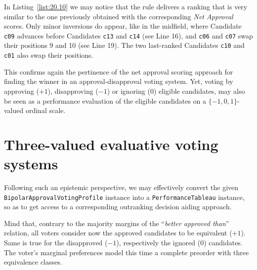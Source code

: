 In Listing~\vref{list:20.10} we may notice that the \NetFlows rule delivers a ranking that is very similar to the one previously obtained with the corresponding \emph{Net Approval} scores. Only minor inversions do appear, like in the midfield, where Candidate \texttt{c09} advances before Candidates \texttt{c13} and \texttt{c14} (see Line 16), and \texttt{c06} and \texttt{c07} swap their positions 9 and 10 (see Line 19). The two last-ranked Candidates \texttt{c10} and \texttt{c01} also swap their positions.

This confirms again the pertinence of the net approval scoring approach for finding the winner in an approval-disapproval voting system. Yet, voting by approving ($+1$), disapproving ($-1$) or ignoring ($0$) eligible candidates, may also be seen as a performance evaluation of the eligible candidates on a $\{-1, 0, 1\}$-valued ordinal scale.

\section{Three-valued evaluative voting systems}
\label{sec:20.4}

Following such an epistemic perspective, we may effectively convert the given \texttt{BipolarApprovalVotingProfile} instance into a \texttt{PerformanceTableau} instance, so as to get access to a corresponding outranking decision aiding approach.

Mind that, contrary to the majority margins of the ``\emph{better approved than}'' relation, all voters consider now the approved candidates to be equivalent ($+1$). Same is true for the disapproved ($-1$), respectively the ignored ($0$) candidates. The voter's marginal preferences model this time a complete preorder with three equivalence classes. 

